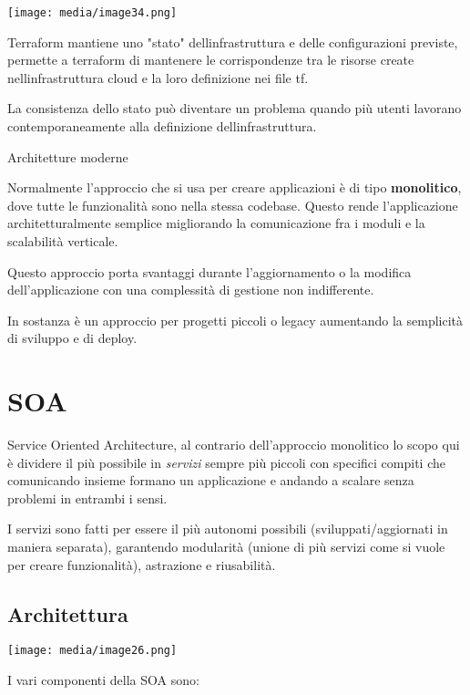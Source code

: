 \texttt{[image: media/image34.png]}

Terraform mantiene uno "stato" dell\textquotesingle infrastruttura e
delle configurazioni previste, permette a terraform di mantenere le
corrispondenze tra le risorse create nell\textquotesingle infrastruttura
cloud e la loro definizione nei file tf.

La consistenza dello stato può diventare un problema quando più utenti
lavorano contemporaneamente alla definizione
dell\textquotesingle infrastruttura.

Architetture moderne

Normalmente l'approccio che si usa per creare applicazioni è di tipo
\textbf{monolitico}, dove tutte le funzionalità sono nella stessa
codebase. Questo rende l'applicazione architetturalmente semplice
migliorando la comunicazione fra i moduli e la scalabilità verticale.

Questo approccio porta svantaggi durante l'aggiornamento o la modifica
dell'applicazione con una complessità di gestione non indifferente.

In sostanza è un approccio per progetti piccoli o legacy aumentando la
semplicità di sviluppo e di deploy.

\section{SOA}\label{soa}

Service Oriented Architecture, al contrario dell'approccio monolitico lo
scopo qui è dividere il più possibile in \emph{servizi} sempre più
piccoli con specifici compiti che comunicando insieme formano un
applicazione e andando a scalare senza problemi in entrambi i sensi.

I servizi sono fatti per essere il più autonomi possibili
(sviluppati/aggiornati in maniera separata), garantendo modularità
(unione di più servizi come si vuole per creare funzionalità),
astrazione e riusabilità.

\subsection{Architettura}\label{architettura}

\texttt{[image: media/image26.png]}

I vari componenti della SOA sono:

